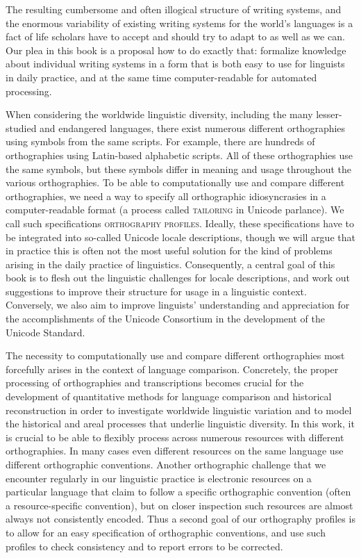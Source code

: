 The resulting cumbersome and often illogical structure of writing systems, and
the enormous variability of existing writing systems for the world's languages
is a fact of life scholars have to accept and should try to adapt to as well as
we can. Our plea in this book is a proposal how to do exactly that: formalize 
knowledge about individual writing systems in a form that is both easy to use 
for linguists in daily practice, and at the same time computer-readable for 
automated processing.

When considering the worldwide linguistic diversity, including the many
lesser-studied and endangered languages, there exist numerous different
orthographies using symbols from the same scripts. For example, there are
hundreds of orthographies using Latin-based alphabetic scripts. All of these
orthographies use the same symbols, but these symbols differ in meaning and
usage throughout the various orthographies. To be able to computationally use
and compare different orthographies, we need a way to specify all orthographic
idiosyncrasies in a computer-readable format (a process called
\textsc{tailoring} in Unicode parlance). We call such specifications
\textsc{orthography profiles}. Ideally, these specifications have to be
integrated into so-called Unicode locale descriptions, though we will argue that
in practice this is often not the most useful solution for the kind of problems
arising in the daily practice of linguistics. Consequently, a central goal of
this book is to flesh out the linguistic challenges for locale descriptions,
and work out suggestions to improve their structure for usage in a linguistic
context. Conversely, we also aim to improve linguists' understanding and
appreciation for the accomplishments of the Unicode Consortium in the
development of the Unicode Standard.

The necessity to computationally use and compare different orthographies most
forcefully arises in the context of language comparison. Concretely, the proper
processing of orthographies and transcriptions becomes crucial for the
development of quantitative methods for language comparison and historical
reconstruction in order to investigate worldwide linguistic variation and to
model the historical and areal processes that underlie linguistic
diversity. In this work, it is crucial to be able to flexibly process across numerous
resources with different orthographies. In many cases even different resources
on the same language use different orthographic conventions. Another
orthographic challenge that we encounter regularly in our linguistic practice is
electronic resources on a particular language that claim to follow a specific
orthographic convention (often a resource-specific convention), but on closer
inspection such resources are almost always not consistently encoded. Thus a
second goal of our orthography profiles is to allow for an easy specification of
orthographic conventions, and use such profiles to check consistency and to
report errors to be corrected.


